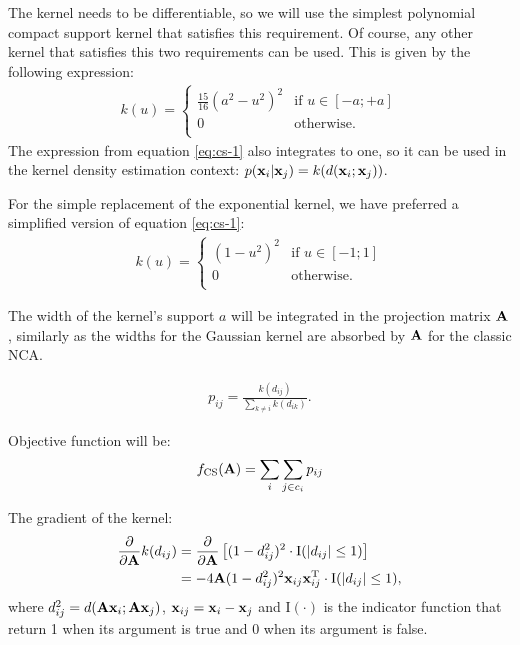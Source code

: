 The kernel needs to be differentiable, so we will use the simplest polynomial compact support kernel that satisfies this requirement. Of course, any other kernel that satisfies this two requirements can be used. This is given by the following expression:
\begin{align}
	k(u)=\begin{cases}
		\frac{15}{16}(a^2-u^2)^2& \mbox{if } u \in [-a;+a]\\
		0& \mbox{otherwise}.\\
	\end{cases}
	\label{eq:cs-1}
\end{align}
The expression from equation \ref{eq:cs-1} also integrates to one, so it can be used in the kernel density estimation context: $p(\mathbf{x}_i|\mathbf{x}_j) = k(d(\mathbf{x}_i;\mathbf{x}_j))$. 

For the simple replacement of the exponential kernel, we have preferred a simplified version of equation \ref{eq:cs-1}: 
	\begin{align}
		k(u)=\begin{cases}
				(1-u^2)^2& \mbox{if } u \in [-1;1]\\
				0& \mbox{otherwise}.\\
			\end{cases}
			\label{eq:cs-1}
	\end{align}
	
	The width of the kernel's support $a$ will be integrated in the projection matrix $\mathbf{A}$, similarly as the widths for the Gaussian kernel are absorbed by $\mathbf{A}$ for the classic NCA.

\begin{align}
	p_{ij} = \frac{k(d_{ij})}{\sum_{k\neq i} k(d_{ik})}.
\end{align}

Objective function will be: 
\begin{align}
	f_\text{CS}(\mathbf{A}) = \sum_{i}\sum_{j\in c_i} p_{ij}
\end{align}

The gradient of the kernel:
\begin{align}
	\frac{\partial}{\partial\mathbf{A}}k(d_{ij}) 
	&= 	\frac{\partial}{\partial\mathbf{A}}\left[(1-d_{ij}^2)^2\cdot\mathrm{I}(\left|d_{ij}\right|\le 1)\right]\\
	&= -4\mathbf{A}(1-d_{ij}^2)^2  \mathbf{x}_{ij} \mathbf{x}_{ij}^\mathrm{T} \cdot \mathrm{I}(\left|d_{ij}\right|\le 1),
\end{align}
where $d_{ij}^2 = d(\mathbf{A}\mathbf{x}_i;\mathbf{A}\mathbf{x}_j)$, $\mathbf{x}_{ij}=\mathbf{x}_i-\mathbf{x}_j$ and $\mathrm{I}(\cdot)$ is the indicator function that return 1 when its argument is true and 0 when its argument is false.

